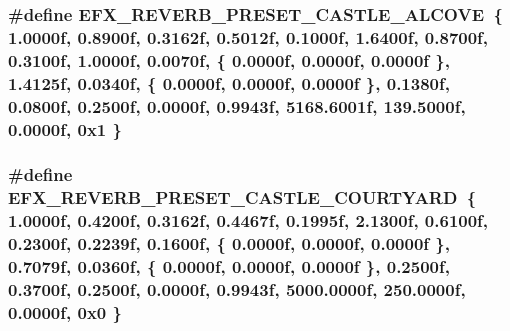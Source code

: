 \subsubsection[{\texorpdfstring{E\+F\+X\+\_\+\+R\+E\+V\+E\+R\+B\+\_\+\+P\+R\+E\+S\+E\+T\+\_\+\+C\+A\+S\+T\+L\+E\+\_\+\+A\+L\+C\+O\+VE}{EFX_REVERB_PRESET_CASTLE_ALCOVE}}]{\setlength{\rightskip}{0pt plus 5cm}\#define E\+F\+X\+\_\+\+R\+E\+V\+E\+R\+B\+\_\+\+P\+R\+E\+S\+E\+T\+\_\+\+C\+A\+S\+T\+L\+E\+\_\+\+A\+L\+C\+O\+VE~\{ 1.\+0000f, 0.\+8900f, 0.\+3162f, 0.\+5012f, 0.\+1000f, 1.\+6400f, 0.\+8700f, 0.\+3100f, 1.\+0000f, 0.\+0070f, \{ 0.\+0000f, 0.\+0000f, 0.\+0000f \}, 1.\+4125f, 0.\+0340f, \{ 0.\+0000f, 0.\+0000f, 0.\+0000f \}, 0.\+1380f, 0.\+0800f, 0.\+2500f, 0.\+0000f, 0.\+9943f, 5168.\+6001f, 139.\+5000f, 0.\+0000f, 0x1 \}}\hypertarget{efx-presets_8h_adde71ddbf4797faa9b58d4b5f7314f56}{}\label{efx-presets_8h_adde71ddbf4797faa9b58d4b5f7314f56}
\subsubsection[{\texorpdfstring{E\+F\+X\+\_\+\+R\+E\+V\+E\+R\+B\+\_\+\+P\+R\+E\+S\+E\+T\+\_\+\+C\+A\+S\+T\+L\+E\+\_\+\+C\+O\+U\+R\+T\+Y\+A\+RD}{EFX_REVERB_PRESET_CASTLE_COURTYARD}}]{\setlength{\rightskip}{0pt plus 5cm}\#define E\+F\+X\+\_\+\+R\+E\+V\+E\+R\+B\+\_\+\+P\+R\+E\+S\+E\+T\+\_\+\+C\+A\+S\+T\+L\+E\+\_\+\+C\+O\+U\+R\+T\+Y\+A\+RD~\{ 1.\+0000f, 0.\+4200f, 0.\+3162f, 0.\+4467f, 0.\+1995f, 2.\+1300f, 0.\+6100f, 0.\+2300f, 0.\+2239f, 0.\+1600f, \{ 0.\+0000f, 0.\+0000f, 0.\+0000f \}, 0.\+7079f, 0.\+0360f, \{ 0.\+0000f, 0.\+0000f, 0.\+0000f \}, 0.\+2500f, 0.\+3700f, 0.\+2500f, 0.\+0000f, 0.\+9943f, 5000.\+0000f, 250.\+0000f, 0.\+0000f, 0x0 \}}\hypertarget{efx-presets_8h_a657914b06a7a4bcefcfc00635fce1673}{}\label{efx-presets_8h_a657914b06a7a4bcefcfc00635fce1673}
